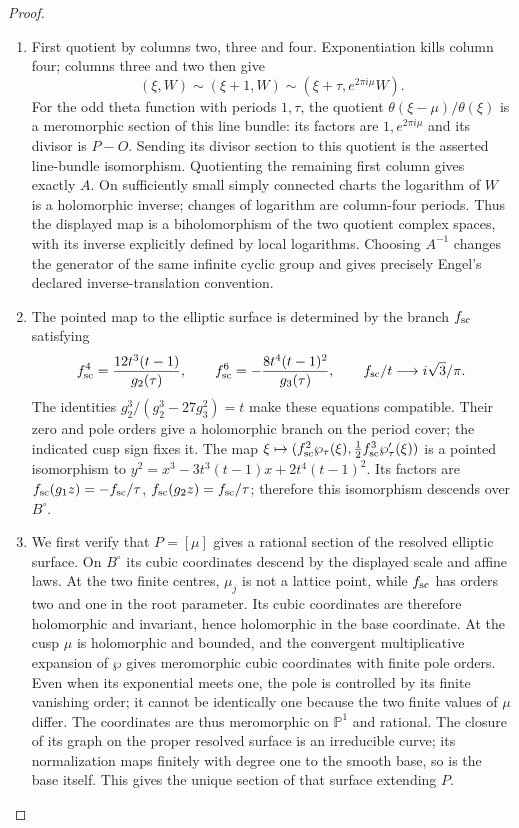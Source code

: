 \begin{proof}
\begin{enumerate}[label=\arabic*.,leftmargin=*]
\item First quotient by columns two, three and four. Exponentiation kills column four; columns three and two then give
\[
 (\xi,W)\sim(\xi+1,W)\sim(\xi+\tau,e^{2\pi i\mu}W).
\]
For the odd theta function with periods $1,\tau$, the quotient $\theta(\xi-\mu)/\theta(\xi)$ is a meromorphic section of this line bundle: its factors are $1,e^{2\pi i\mu}$ and its divisor is $P-O$. Sending its divisor section to this quotient is the asserted line-bundle isomorphism. Quotienting the remaining first column gives exactly $A$. On sufficiently small simply connected charts the logarithm of $W$ is a holomorphic inverse; changes of logarithm are column-four periods. Thus the displayed map is a biholomorphism of the two quotient complex spaces, with its inverse explicitly defined by local logarithms. Choosing $A^{-1}$ changes the generator of the same infinite cyclic group and gives precisely Engel's declared inverse-translation convention.

\item The pointed map to the elliptic surface is determined by the branch $f_{\rm sc}$ satisfying
\[
 f_{\rm sc}^4=\frac{12t^3(t-1)}{g_2(\tau)},\qquad
 f_{\rm sc}^6=-\frac{8t^4(t-1)^2}{g_3(\tau)},\qquad
 f_{\rm sc}/t\longrightarrow i\sqrt3/\pi.
\]
The identities $g_2^3/(g_2^3-27g_3^2)=t$ make these equations compatible. Their zero and pole orders give a holomorphic branch on the period cover; the indicated cusp sign fixes it. The map $\xi\mapsto(f_{\rm sc}^2\wp_\tau(\xi),\frac12f_{\rm sc}^3\wp'_\tau(\xi))$ is a pointed isomorphism to
$y^2=x^3-3t^3(t-1)x+2t^4(t-1)^2$. Its factors are $f_{\rm sc}(g_1z)=-f_{\rm sc}/\tau$, $f_{\rm sc}(g_2z)=f_{\rm sc}/\tau$; therefore this isomorphism descends over $B^\circ$.

\item We first verify that $P=[\mu]$ gives a rational section of the resolved elliptic surface. On $B^\circ$ its cubic coordinates descend by the displayed scale and affine laws. At the two finite centres, $\mu_j$ is not a lattice point, while $f_{\rm sc}$ has orders two and one in the root parameter. Its cubic coordinates are therefore holomorphic and invariant, hence holomorphic in the base coordinate. At the cusp $\mu$ is holomorphic and bounded, and the convergent multiplicative expansion of $\wp$ gives meromorphic cubic coordinates with finite pole orders. Even when its exponential meets one, the pole is controlled by its finite vanishing order; it cannot be identically one because the two finite values of $\mu$ differ. The coordinates are thus meromorphic on $\mathbb P^1$ and rational. The closure of its graph on the proper resolved surface is an irreducible curve; its normalization maps finitely with degree one to the smooth base, so is the base itself. This gives the unique section of that surface extending $P$.


\end{enumerate}
\end{proof}
